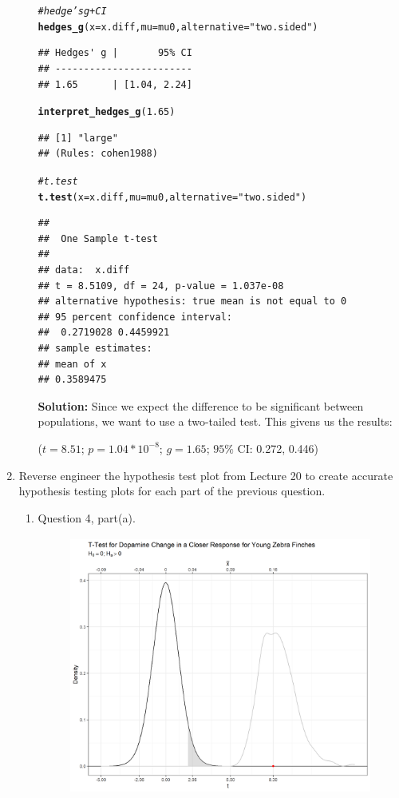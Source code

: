\documentclass{article}\usepackage[]{graphicx}\usepackage[]{xcolor}
\makeatletter
\newcommand{\hlnum}[1]{\textcolor[rgb]{0.686,0.059,0.569}{#1}}%
\newcommand{\hlsng}[1]{\textcolor[rgb]{0.192,0.494,0.8}{#1}}%
\newcommand{\hlcom}[1]{\textcolor[rgb]{0.678,0.584,0.686}{\textit{#1}}}%
\newcommand{\hldef}[1]{\textcolor[rgb]{0.345,0.345,0.345}{#1}}%
\newcommand{\hlkwc}[1]{\textcolor[rgb]{0.333,0.667,0.333}{#1}}%
\newcommand{\hlkwd}[1]{\textcolor[rgb]{0.737,0.353,0.396}{\textbf{#1}}}%
\newenvironment{kframe}{%
 \def\at@end@of@kframe{}%
 \ifinner\ifhmode%
  \def\at@end@of@kframe{\end{minipage}}%
  \begin{minipage}{\columnwidth}%
 \fi\fi%
 \def\FrameCommand##1{\hskip\@totalleftmargin \hskip-\fboxsep
 \colorbox{shadecolor}{##1}\hskip-\fboxsep
     \hskip-\linewidth \hskip-\@totalleftmargin \hskip\columnwidth}%
 \MakeFramed {\advance\hsize-\width
   \@totalleftmargin\z@ \linewidth\hsize
   \@setminipage}}%
 {\par\unskip\endMakeFramed%
 \at@end@of@kframe}
\newenvironment{knitrout}{}{} %
\makeatother
\begin{document}
\begin{enumerate}
\begin{enumerate}
\begin{knitrout}
\begin{kframe}
\begin{alltt}
\hlcom{# hedge's g + CI}
\hlkwd{hedges_g}\hldef{(}\hlkwc{x} \hldef{= x.diff,} \hlkwc{mu} \hldef{= mu0,} \hlkwc{alternative} \hldef{=} \hlsng{"two.sided"}\hldef{)}
\end{alltt}
\begin{verbatim}
## Hedges' g |       95% CI
## ------------------------
## 1.65      | [1.04, 2.24]
\end{verbatim}
\begin{alltt}
\hlkwd{interpret_hedges_g}\hldef{(}\hlnum{1.65}\hldef{)}
\end{alltt}
\begin{verbatim}
## [1] "large"
## (Rules: cohen1988)
\end{verbatim}
\begin{alltt}
\hlcom{# t.test}
\hlkwd{t.test}\hldef{(}\hlkwc{x}\hldef{=x.diff,} \hlkwc{mu} \hldef{= mu0,} \hlkwc{alternative} \hldef{=} \hlsng{"two.sided"}\hldef{)}
\end{alltt}
\begin{verbatim}
## 
## 	One Sample t-test
## 
## data:  x.diff
## t = 8.5109, df = 24, p-value = 1.037e-08
## alternative hypothesis: true mean is not equal to 0
## 95 percent confidence interval:
##  0.2719028 0.4459921
## sample estimates:
## mean of x 
## 0.3589475
\end{verbatim}
\end{kframe}
\end{knitrout}
\textbf{Solution:} Since we expect the difference to be significant between populations, we want to use a two-tailed test. This givens us the results: 
\begin{center}
($t = 8.51$; $p = 1.04 * 10^{-8}$; $g = 1.65$; $95\%$ CI: 0.272, 0.446)
\end{center}
\end{enumerate}
\newpage
\item Reverse engineer the hypothesis test plot from Lecture 20 to create accurate
hypothesis testing plots for each part of the previous question.
\begin{enumerate}
  \item Question 4, part(a).
  \begin{figure}[H]
\centering
\includegraphics[width=10cm, height=8.5cm]{task5plot1.png}

\end{figure}
\end{enumerate}
\end{enumerate}
\end{document}
